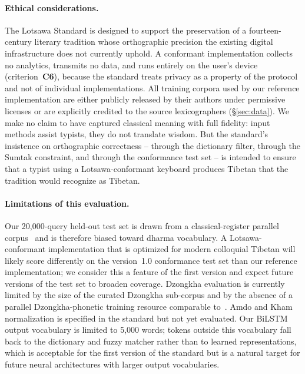 \documentclass[11pt]{article}
\begin{document}
\paragraph{Ethical considerations.} The Lotsawa Standard is designed to support the preservation of a fourteen-century literary tradition whose orthographic precision the existing digital infrastructure does not currently uphold. A conformant implementation collects no analytics, transmits no data, and runs entirely on the user's device (criterion~\textbf{C6}), because the standard treats privacy as a property of the protocol and not of individual implementations. All training corpora used by our reference implementation are either publicly released by their authors under permissive licenses or are explicitly credited to the source lexicographers (\S\ref{sec:data}). We make no claim to have captured classical meaning with full fidelity: input methods assist typists, they do not translate wisdom. But the standard's insistence on orthographic correctness -- through the dictionary filter, through the Sumtak constraint, and through the conformance test set -- is intended to ensure that a typist using a Lotsawa-conformant keyboard produces Tibetan that the tradition would recognize as Tibetan.

\paragraph{Limitations of this evaluation.} Our 20{,}000-query held-out test set is drawn from a classical-register parallel corpus~\cite{billingsmoore_hf} and is therefore biased toward dharma vocabulary. A Lotsawa-conformant implementation that is optimized for modern colloquial Tibetan will likely score differently on the version~1.0 conformance test set than our reference implementation; we consider this a feature of the first version and expect future versions of the test set to broaden coverage. Dzongkha evaluation is currently limited by the size of the curated Dzongkha sub-corpus and by the absence of a parallel Dzongkha-phonetic training resource comparable to~\citet{billingsmoore_hf}. Amdo and Kham normalization is specified in the standard but not yet evaluated. Our BiLSTM output vocabulary is limited to 5{,}000 words; tokens outside this vocabulary fall back to the dictionary and fuzzy matcher rather than to learned representations, which is acceptable for the first version of the standard but is a natural target for future neural architectures with larger output vocabularies.
\end{document}
